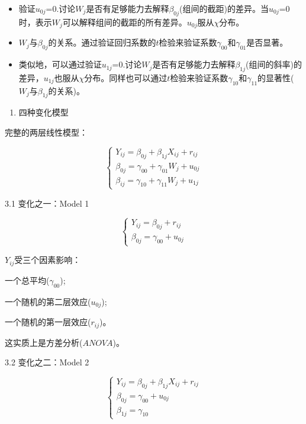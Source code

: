 \documentclass[
]{book}
\providecommand{\tightlist}{%
  \setlength{\itemsep}{0pt}\setlength{\parskip}{0pt}}
\begin{document}
\begin{itemize}
\item
  验证\(u_{0j}\)=0.讨论\(W_j\)是否有足够能力去解释\(\beta_{0j}\)(组间的截距)的差异。当\(u_{0j}\)=0时，表示\(W_j\)可以解释组间的截距的所有差异。\(u_{0j}\)服从\(\chi\)分布。
\item
  \(W_j\)与\(\beta_{0j}\)的关系。通过验证回归系数的\(t\)检验来验证系数\(\gamma_{00}\)和\(\gamma_{01}\)是否显著。
\item
  类似地，可以通过验证\(u_{1j}\)=0.讨论\(W_j\)是否有足够能力去解释\(\beta_{1j}\)(组间的斜率)的差异，\(u_{1j}\)也服从\(\chi\)分布。同样也可以通过\(t\)检验来验证系数\(\gamma_{10}\)和\(\gamma_{11}\)的显著性(\(W_j\)与\(\beta_{1j}\)的关系)。
\end{itemize}

\begin{enumerate}
\def\labelenumi{\arabic{enumi}.}
\setcounter{enumi}{2}
\tightlist
\item
  四种变化模型
\end{enumerate}

完整的两层线性模型：

\[
\left\{ \begin{aligned} 
        Y_{ij} = \beta_{0j} + \beta_{1j}X_{ij} + r_{ij} \\
        \beta_{0j} = \gamma_{00} + \gamma_{01}W_j + u_{0j} \\
         \beta_{ij} = \gamma_{10} + \gamma_{11}W_j + u_{1j}   
\end{aligned} \right.
\]

3.1 变化之一：Model 1

\[
\left\{ \begin{aligned} 
        Y_{ij} = \beta_{0j} + r_{ij} \\
        \beta_{0j} = \gamma_{00} + u_{0j}       
\end{aligned} \right.
\]

\(Y_{ij}\)受三个因素影响：

一个总平均(\(\gamma_{00}\));

一个随机的第二层效应(\(u_{0j}\));

一个随机的第一层效应(\(r_{ij}\))。

这实质上是方差分析(\(ANOVA\))。

3.2 变化之二：Model 2

\[
\left\{ \begin{aligned} 
        Y_{ij} = \beta_{0j} + \beta_{1j}X_{ij}+ r_{ij} \\
        \beta_{0j} = \gamma_{00} + u_{0j} \\
        \beta_{1j} = \gamma_{10}       
\end{aligned} \right.
\]
\end{document}
